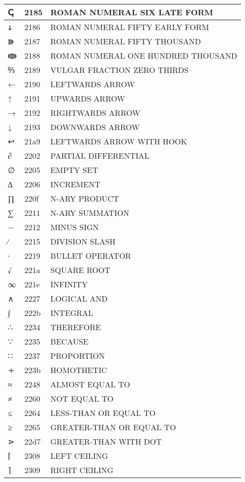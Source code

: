 \documentclass[12pt,letterpaper,openany]{book}
\begin{document}
\begin{center}
\begin{supertabular}{|m{0.25in}|m{0.5in}|m{4in}|}
			ↅ & 2185 & ROMAN NUMERAL SIX LATE FORM\\\hline
			ↆ & 2186 & ROMAN NUMERAL FIFTY EARLY FORM\\\hline
			ↇ & 2187 & ROMAN NUMERAL FIFTY THOUSAND\\\hline
			ↈ & 2188 & ROMAN NUMERAL ONE HUNDRED THOUSAND\\\hline
			↉ & 2189 & VULGAR FRACTION ZERO THIRDS\\\hline
			← & 2190 & LEFTWARDS ARROW\\\hline
			↑ & 2191 & UPWARDS ARROW\\\hline
			→ & 2192 & RIGHTWARDS ARROW\\\hline
			↓ & 2193 & DOWNWARDS ARROW\\\hline
			↩ & 21a9 & LEFTWARDS ARROW WITH HOOK\\\hline
			∂ & 2202 & PARTIAL DIFFERENTIAL\\\hline
			∅ & 2205 & EMPTY SET\\\hline
			∆ & 2206 & INCREMENT\\\hline
			∏ & 220f & N-ARY PRODUCT\\\hline
			∑ & 2211 & N-ARY SUMMATION\\\hline
			− & 2212 & MINUS SIGN\\\hline
			∕ & 2215 & DIVISION SLASH\\\hline
			∙ & 2219 & BULLET OPERATOR\\\hline
			√ & 221a & SQUARE ROOT\\\hline
			∞ & 221e & INFINITY\\\hline
			∧ & 2227 & LOGICAL AND\\\hline
			∫ & 222b & INTEGRAL\\\hline
			∴ & 2234 & THEREFORE\\\hline
			∵ & 2235 & BECAUSE\\\hline
			∷ & 2237 & PROPORTION\\\hline
			∻ & 223b & HOMOTHETIC\\\hline
			≈ & 2248 & ALMOST EQUAL TO\\\hline
			≠ & 2260 & NOT EQUAL TO\\\hline
			≤ & 2264 & LESS-THAN OR EQUAL TO\\\hline
			≥ & 2265 & GREATER-THAN OR EQUAL TO\\\hline
			⋗ & 22d7 & GREATER-THAN WITH DOT\\\hline
			⌈ & 2308 & LEFT CEILING\\\hline
			⌉ & 2309 & RIGHT CEILING\\\hline

\end{supertabular}
\end{center}
\end{document}
